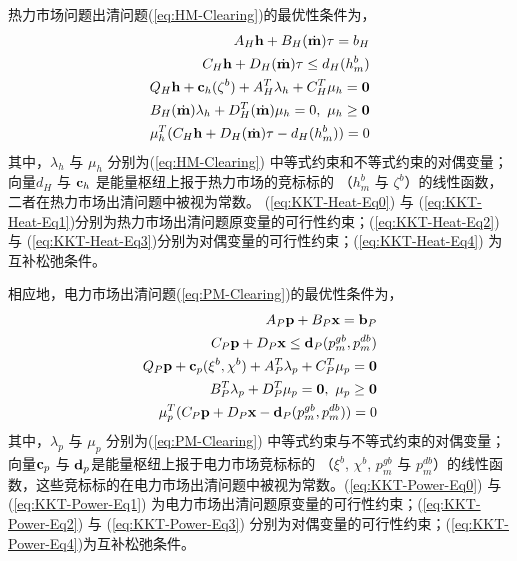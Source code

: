 热力市场问题出清问题(\ref{eq:HM-Clearing})的最优性条件为，
\begin{subequations}
\label{eq:KKT-Heat}
\begin{align}
A_H{\bf h} + B_H(\dot {\bf m})\tau = b_H \label{eq:KKT-Heat-Eq0} \\
C_H{\bf h} + D_H(\dot {\bf m})\tau \le d_H(h^b_m) \label{eq:KKT-Heat-Eq1} \\
Q_H{\bf h} + {\bf c}_h (\zeta^b) + A_H^T \lambda_h + C_H^T \mu_h = {\bf 0} \label{eq:KKT-Heat-Eq2} \\
B_H(\dot {\bf m})\lambda_h + D_H^T(\dot {\bf m})\mu_h = 0,~
\mu_h \ge {\bf 0} \label{eq:KKT-Heat-Eq3} \\
{\mu_h ^T}( C_H {\bf h} + D_H (\dot {\bf m})\tau - d_H(h^b_m) )=0 \label{eq:KKT-Heat-Eq4}
\end{align}
\end{subequations}
其中，$\lambda_h$ 与 $\mu_h$ 分别为(\ref{eq:HM-Clearing}) 中等式约束和不等式约束的对偶变量；向量$d_H$ 与 ${\bf c}_h$ 是能量枢纽上报于热力市场的竞标标的 （$h^b_m$ 与 $\zeta^b$）的线性函数，二者在热力市场出清问题中被视为常数。 (\ref{eq:KKT-Heat-Eq0}) 与 (\ref{eq:KKT-Heat-Eq1})分别为热力市场出清问题原变量的可行性约束；(\ref{eq:KKT-Heat-Eq2}) 与 (\ref{eq:KKT-Heat-Eq3})分别为对偶变量的可行性约束；(\ref{eq:KKT-Heat-Eq4}) 为互补松弛条件。

相应地，电力市场出清问题(\ref{eq:PM-Clearing})的最优性条件为，
\begin{subequations}
\label{eq:KKT-Power}
\begin{align}
A_P {\bf p} + B_P {\bf x} = {\bf b}_P \label{eq:KKT-Power-Eq0}\\
C_P {\bf p} + D_P {\bf x} \le {\bf d}_P(p^{gb}_m, p^{db}_m) \label{eq:KKT-Power-Eq1}\\
Q_P {\bf p} + {\bf c}_p (\xi^b,\chi^b) + A_P^T \lambda_p + C_P^T \mu_p ={\bf 0} \label{eq:KKT-Power-Eq2}\\
B_P^T\lambda_p + D_P^T\mu_p = {\bf 0},~\mu_p \ge {\bf 0}  \label{eq:KKT-Power-Eq3}\\
\mu_p ^T ( C_P {\bf p} + D_P{\bf x} - {\bf d}_P(p^{gb}_m, p^{db}_m) ) = 0 \label{eq:KKT-Power-Eq4}
\end{align}
\end{subequations}
其中，$\lambda_p$ 与 $\mu_p$ 分别为(\ref{eq:PM-Clearing}) 中等式约束与不等式约束的对偶变量；向量${\bf c}_p$ 与 ${\bf d}_p$是能量枢纽上报于电力市场竞标标的 （$\xi^b$, $\chi^b$, $p^{gb}_m$ 与 $p^{db}_m$）的线性函数，这些竞标标的在电力市场出清问题中被视为常数。(\ref{eq:KKT-Power-Eq0}) 与 (\ref{eq:KKT-Power-Eq1}) 为电力市场出清问题原变量的可行性约束；(\ref{eq:KKT-Power-Eq2}) 与 (\ref{eq:KKT-Power-Eq3}) 分别为对偶变量的可行性约束；(\ref{eq:KKT-Power-Eq4})为互补松弛条件。

